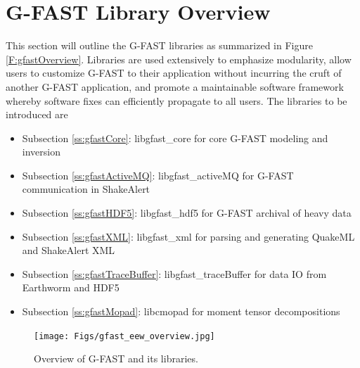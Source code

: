 \documentclass[12pt]{article}
\begin{document}
\clearpage
\section{G-FAST Library Overview}
This section will outline the G-FAST libraries as summarized in Figure \ref{F:gfastOverview}.  
Libraries are used extensively 
to emphasize modularity, allow users to customize G-FAST to their application 
without incurring the cruft of another G-FAST application, and promote a maintainable
software framework whereby software fixes can efficiently propagate to all users.  
The libraries to be introduced are
\begin{itemize} 
 \item Subsection \ref{ss:gfastCore}: libgfast\_core for core G-FAST modeling and inversion  
 \item Subsection \ref{ss:gfastActiveMQ}: libgfast\_activeMQ for G-FAST communication in ShakeAlert
 \item Subsection \ref{ss:gfastHDF5}: libgfast\_hdf5 for G-FAST archival of heavy data
 \item Subsection \ref{ss:gfastXML}: libgfast\_xml for parsing and generating QuakeML and ShakeAlert XML
 \item Subsection \ref{ss:gfastTraceBuffer}: libgfast\_traceBuffer for data IO from Earthworm and HDF5
 \item Subsection \ref{ss:gfastMopad}: libcmopad for moment tensor decompositions 
\end{itemize}

\begin{center}
\begin{figure}
\texttt{[image: Figs/gfast\_eew\_overview.jpg]}
\caption{Overview of G-FAST and its libraries.}
\end{figure}\label{F:gfastOverview}
\end{center}

\clearpage
\end{document}
